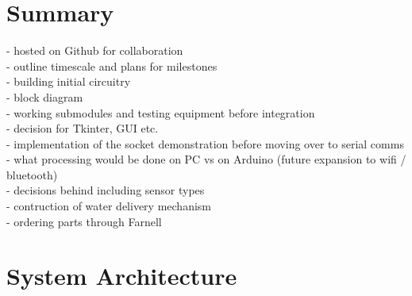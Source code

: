 \documentclass[a4paper,11pt]{article}
\begin{document}
\section{Summary}
\label{sec:Summary}
- hosted on Github for collaboration \\
- outline timescale and plans for milestones\\
- building initial circuitry\\
- block diagram\\
- working submodules and testing equipment before integration\\
- decision for Tkinter, GUI etc.\\
- implementation of the socket demonstration before moving over to serial comms \\
- what processing would be done on PC vs on Arduino (future expansion to wifi / bluetooth)\\
- decisions behind including sensor types \\
- contruction of water delivery mechanism\\
- ordering parts through Farnell

\begin{table}[H]
    \centering
    \renewcommand{\arraystretch}{1.5} 
    \caption{Component Order Summary}
    \label{tab:component_order}
\end{table}

\section{System Architecture}
\label{sec:System_Architecture}
\end{document}
